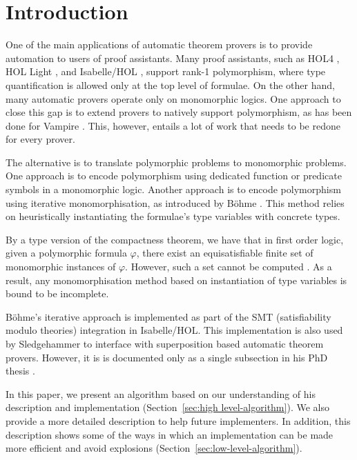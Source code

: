 \documentclass[]{ceurart}
\begin{document}
\maketitle

\section{Introduction}

One of the main applications of automatic theorem provers is to provide automation to users of proof assistants. Many proof assistants, such as HOL4 \cite{slind-norrish-2008}, HOL Light \cite{harrison-2009}, and
Isabelle/HOL \cite{nipkow-et-al-2002}, support rank-1 polymorphism, where type quantification is allowed only at the top level of formulae. On the other hand, many automatic provers operate only on monomorphic logics. One approach to close this gap is to extend provers to natively support polymorphism, as has been done for Vampire \cite{bhayat-reger-2020}. This, however, entails a lot of work that needs to be redone for every prover.

The alternative is to translate polymorphic problems to monomorphic problems. One approach is to encode polymorphism using dedicated function or predicate symbols \cite{mono-trans} in a monomorphic logic. Another approach is to encode polymorphism using {iterative monomorphisation}, as introduced by B\"ohme \cite[Section 2.2.1]{sb-phd}. This method relies on heuristically instantiating the formulae's type variables with concrete types.

By a type version of the compactness theorem, we have that in first order logic, given a polymorphic formula \(\varphi\), there exist an equisatisfiable finite set of monomorphic instances of \(\varphi\). However, such a set cannot be computed \cite[Theorem 1]{expr-poly-types}. As a result, any monomorphisation method based on instantiation of type variables is
bound to be incomplete.

B\"ohme's iterative approach is implemented as part of the SMT (satisfiability modulo theories) integration \cite[Chapter 2]{sb-phd} in Isabelle/HOL. This implementation is also used by Sledgehammer \cite{judgement, hammer} to interface with superposition based automatic theorem provers. However, it is is documented only as a single subsection in his PhD thesis \cite[Section 2.2.1]{sb-phd}.

In this paper, we present an algorithm based on our understanding of his description and implementation (Section~\ref{sec:high level-algorithm}). We also provide a more detailed description to help future implementers. In addition, this description shows some of the ways in which an implementation can be made more efficient and avoid explosions (Section~\ref{sec:low-level-algorithm}).
\end{document}
